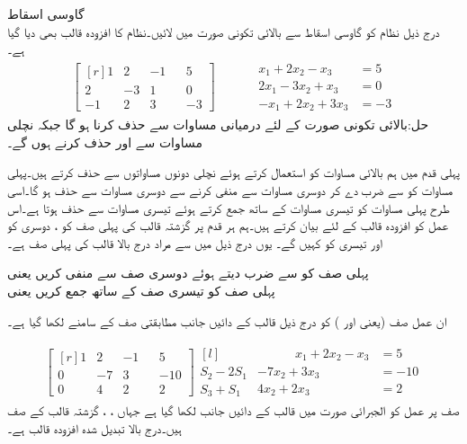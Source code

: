 \quad گاوسی اسقاط\\
درج ذیل نظام کو گاوسی اسقاط سے بالائی تکونی صورت میں لائیں۔نظام کا افزودہ قالب بھی دیا گیا ہے۔
\begin{gather*}
\begin{bmatrix*}[r]
1&2&-1&&5\\
2&-3&1&&0\\
-1&2&3&&-3
\end{bmatrix*}\quad \quad \quad
\begin{aligned}
x_1+2x_2-x_3&=5\\
2x_1-3x_2+x_3&=0\\
-x_1+2x_2+3x_3&=-3
\end{aligned}
\end{gather*}
حل:بالائی تکونی صورت کے لئے درمیانی مساوات سے  حذف کرنا ہو گا جبکہ نچلی مساوات سے  اور  حذف کرنے ہوں گے۔

پہلی قدم میں ہم بالائی مساوات  کو استعمال کرتے ہوئے نچلی دونوں مساواتوں سے  حذف کرتے ہیں۔پہلی مساوات کو  سے ضرب دے کر دوسری مساوات سے منفی کرنے سے دوسری مساوات سے  حذف ہو گا۔اسی طرح پہلی مساوات کو تیسری مساوات کے ساتھ جمع کرتے ہوئے تیسری مساوات سے  حذف ہوتا ہے۔اس عمل کو افزودہ قالب کے لئے بیان کرتے ہیں۔ہم ہر قدم پر گزشتہ قالب کی پہلی صف کو ، دوسری کو  اور تیسری کو  کہیں گے۔ یوں درج ذیل میں  سے مراد درج بالا قالب کی پہلی صف  ہے۔

 پہلی صف کو  سے ضرب دیتے ہوئے دوسری صف سے منفی کریں یعنی \\
پہلی صف کو تیسری صف کے ساتھ جمع کریں یعنی 

ان عمل صف (یعنی  اور ) کو درج ذیل قالب کے دائیں جانب مطابقتی صف کے سامنے لکھا گیا ہے۔

\begin{gather*}
\begin{bmatrix*}[r] 1&2&-1&&5\\0&-7&3&&-10\\0&4&2&&2  \end{bmatrix*}\begin{matrix*}[l]  \\ S_2-2S_1\\S_3+S_1\end{matrix*}
\begin{aligned}\quad \quad \quad
x_1+2x_2-x_3&=5\\
-7x_2+3x_3&=-10\\
4x_2+2x_3&=2
\end{aligned}
\end{gather*}
صف پر عمل کو الجبرائی صورت میں قالب کے دائیں جانب لکھا گیا ہے جہاں ، ،   گزشتہ قالب کے صف ہیں۔درج بالا تبدیل شدہ افزودہ قالب ہے۔

